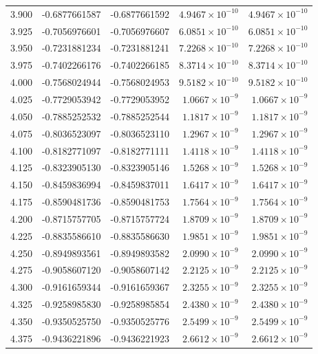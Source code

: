 \documentclass[11pt,a4paper]{article}
\begin{document}
\begin{longtable}{rrrrr}
3.900 & -0.6877661587 & -0.6877661592 & $4.9467\times 10^{-10}$ & $4.9467\times 10^{-10}$ \\
3.925 & -0.7056976601 & -0.7056976607 & $6.0851\times 10^{-10}$ & $6.0851\times 10^{-10}$ \\
3.950 & -0.7231881234 & -0.7231881241 & $7.2268\times 10^{-10}$ & $7.2268\times 10^{-10}$ \\
3.975 & -0.7402266176 & -0.7402266185 & $8.3714\times 10^{-10}$ & $8.3714\times 10^{-10}$ \\
4.000 & -0.7568024944 & -0.7568024953 & $9.5182\times 10^{-10}$ & $9.5182\times 10^{-10}$ \\
4.025 & -0.7729053942 & -0.7729053952 & $1.0667\times 10^{-9}$ & $1.0667\times 10^{-9}$ \\
4.050 & -0.7885252532 & -0.7885252544 & $1.1817\times 10^{-9}$ & $1.1817\times 10^{-9}$ \\
4.075 & -0.8036523097 & -0.8036523110 & $1.2967\times 10^{-9}$ & $1.2967\times 10^{-9}$ \\
4.100 & -0.8182771097 & -0.8182771111 & $1.4118\times 10^{-9}$ & $1.4118\times 10^{-9}$ \\
4.125 & -0.8323905130 & -0.8323905146 & $1.5268\times 10^{-9}$ & $1.5268\times 10^{-9}$ \\
4.150 & -0.8459836994 & -0.8459837011 & $1.6417\times 10^{-9}$ & $1.6417\times 10^{-9}$ \\
4.175 & -0.8590481736 & -0.8590481753 & $1.7564\times 10^{-9}$ & $1.7564\times 10^{-9}$ \\
4.200 & -0.8715757705 & -0.8715757724 & $1.8709\times 10^{-9}$ & $1.8709\times 10^{-9}$ \\
4.225 & -0.8835586610 & -0.8835586630 & $1.9851\times 10^{-9}$ & $1.9851\times 10^{-9}$ \\
4.250 & -0.8949893561 & -0.8949893582 & $2.0990\times 10^{-9}$ & $2.0990\times 10^{-9}$ \\
4.275 & -0.9058607120 & -0.9058607142 & $2.2125\times 10^{-9}$ & $2.2125\times 10^{-9}$ \\
4.300 & -0.9161659344 & -0.9161659367 & $2.3255\times 10^{-9}$ & $2.3255\times 10^{-9}$ \\
4.325 & -0.9258985830 & -0.9258985854 & $2.4380\times 10^{-9}$ & $2.4380\times 10^{-9}$ \\
4.350 & -0.9350525750 & -0.9350525776 & $2.5499\times 10^{-9}$ & $2.5499\times 10^{-9}$ \\
4.375 & -0.9436221896 & -0.9436221923 & $2.6612\times 10^{-9}$ & $2.6612\times 10^{-9}$ \\

\end{longtable}
\end{document}
